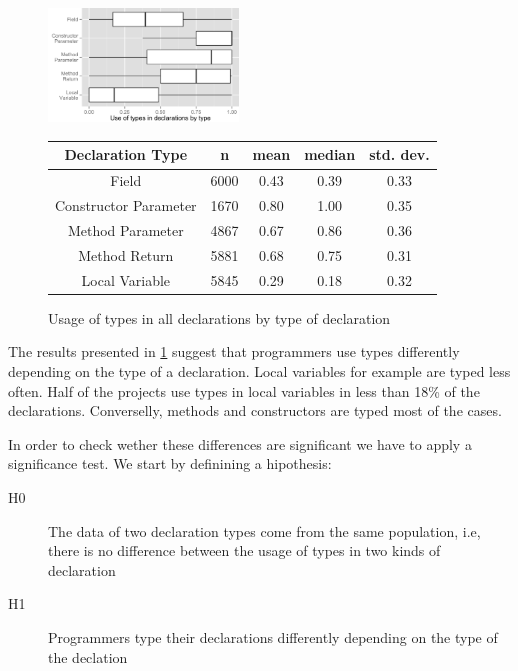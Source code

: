 \documentclass[preprint]{sigplanconf}
\begin{document}
\begin{figure}[h]
\centering 
\includegraphics[width=0.45\textwidth]{../analysis/result/all/boxplots/6_declarations_by_type.png} 
\label{fig:all_boxplot_type} 

\vspace{0.3cm}

\renewcommand{\arraystretch}{1.2}
\small
\begin{tabular}{|c|c|c|c|c|}
\hline
Declaration Type		& n		& mean	& median		& std. dev.	\\
\hline
\hline
Field					& 6000	& 0.43	& 0.39		& 0.33		\\ \hline
Constructor Parameter	& 1670	& 0.80	& 1.00		& 0.35		\\ \hline
Method Parameter		& 4867	& 0.67	& 0.86		& 0.36		\\ \hline
Method Return			& 5881	& 0.68	& 0.75		& 0.31		\\ \hline
Local Variable			& 5845	& 0.29	& 0.18		& 0.32		\\ \hline
\end{tabular}

\caption{Usage of types in all declarations by type of declaration}

\end{figure}

The results presented in \ref{fig:all_boxplot_type} suggest that programmers use types differently depending on the type of a declaration.
Local variables for example are typed less often.
Half of the projects use types in local variables in less than 18\% of the declarations.
Converselly, methods and constructors are typed most of the cases.

In order to check wether these differences are significant we have to apply a significance test. We start by definining a hipothesis:
\begin{description}
\item[H0] The data of two declaration types come from the same population, i.e, there is no difference between the usage of types in two kinds of declaration
\item[H1] Programmers type their declarations differently depending on the type of the declation
\end{description}
\end{document}
